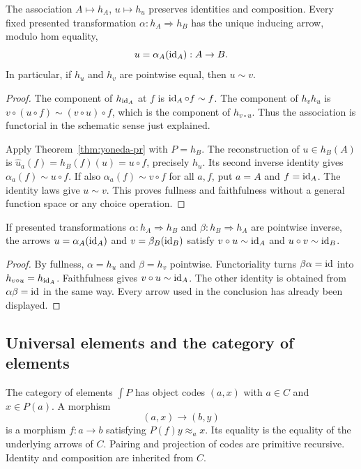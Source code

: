 \begin{theorem}
\label{thm:yoneda-fully-faithful}
The association $A\mapsto h_A$, $u\mapsto h_u$ preserves identities and
composition.  Every fixed presented transformation $\alpha:h_A\Rightarrow h_B$
has the unique inducing arrow, modulo hom equality,
\[
 u=\alpha_A(\operatorname{id}_A):A\to B.
\]
In particular, if $h_u$ and $h_v$ are pointwise equal, then $u\sim v$.
\end{theorem}
\begin{proof}
The component of $h_{\operatorname{id}_A}$ at $f$ is $\operatorname{id}_A\circ f\sim f$.
The component of $h_v h_u$ is $v\circ(u\circ f)\sim(v\circ u)\circ f$,
which is the component of $h_{v\circ u}$.  Thus the association is functorial
in the schematic sense just explained.

Apply Theorem~\ref{thm:yoneda-pr} with $P=h_B$.  The reconstruction of
$u\in h_B(A)$ is
$\widehat{u}_a(f)=h_B(f)(u)=u\circ f$, precisely $h_u$.  Its second inverse
identity gives $\alpha_a(f)\sim u\circ f$.  If also
$\alpha_a(f)\sim v\circ f$ for all $a,f$, put $a=A$ and $f=\operatorname{id}_A$.
The identity laws give $u\sim v$.  This proves fullness and faithfulness
without a general function space or any choice operation.
\end{proof}

\begin{corollary}
If presented transformations $\alpha:h_A\Rightarrow h_B$ and
$\beta:h_B\Rightarrow h_A$ are pointwise inverse, the arrows
$u=\alpha_A(\operatorname{id}_A)$ and $v=\beta_B(\operatorname{id}_B)$ satisfy
$v\circ u\sim\operatorname{id}_A$ and $u\circ v\sim\operatorname{id}_B$.
\end{corollary}
\begin{proof}
By fullness, $\alpha=h_u$ and $\beta=h_v$ pointwise.  Functoriality turns
$\beta\alpha=\operatorname{id}$ into $h_{v\circ u}=h_{\operatorname{id}_A}$.  Faithfulness gives
$v\circ u\sim\operatorname{id}_A$.  The other identity is obtained from
$\alpha\beta=\operatorname{id}$ in the same way.  Every arrow used in the conclusion has
already been displayed.
\end{proof}

\subsection{Universal elements and the category of elements}

The category of elements $\int P$ has object codes $(a,x)$ with
$a\in C$ and $x\in P(a)$.  A morphism
\[
 (a,x)\longrightarrow(b,y)
\]
is a morphism $f:a\to b$ satisfying $P(f)y\approx_a x$.
Its equality is the equality of the underlying arrows of $C$.  Pairing and
projection of codes are primitive recursive.  Identity and composition are
inherited from $C$.

